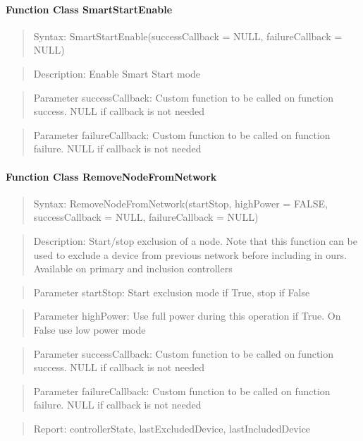 \paragraph{Function Class SmartStartEnable}
\begin{quote}Syntax: SmartStartEnable(successCallback = NULL, failureCallback = NULL)\end{quote}
\begin{quote}Description: Enable Smart Start mode\end{quote}
\begin{quote}Parameter successCallback: Custom function to be called on function success. NULL if callback is not needed\end{quote}
\begin{quote}Parameter failureCallback: Custom function to be called on function failure. NULL if callback is not needed\end{quote}


\paragraph{Function Class RemoveNodeFromNetwork}
\begin{quote}Syntax: RemoveNodeFromNetwork(startStop, highPower = FALSE, successCallback = NULL, failureCallback = NULL)\end{quote}
\begin{quote}Description: Start/stop exclusion of a node. Note that this function can be used to exclude a device from previous network before including in ours. Available on primary and inclusion controllers\end{quote}
\begin{quote}Parameter startStop: Start exclusion mode if True, stop if False\end{quote}
\begin{quote}Parameter highPower: Use full power during this operation if True. On False use low power mode\end{quote}
\begin{quote}Parameter successCallback: Custom function to be called on function success. NULL if callback is not needed\end{quote}
\begin{quote}Parameter failureCallback: Custom function to be called on function failure. NULL if callback is not needed\end{quote}
\begin{quote}Report: controllerState, lastExcludedDevice, lastIncludedDevice\end{quote}


